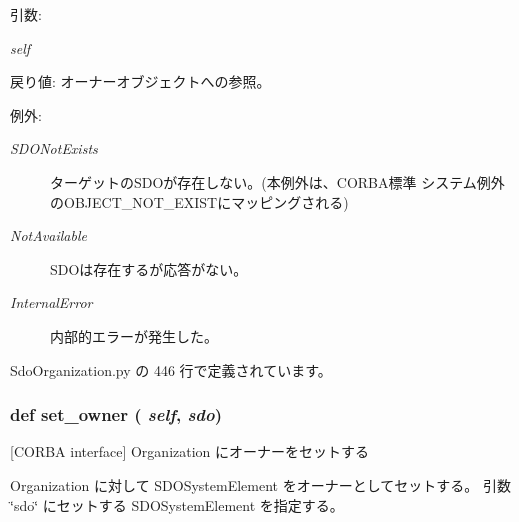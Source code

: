 \begin{Desc}
\item[引数:]
\begin{description}
\item[{\em self}]\end{description}
\end{Desc}
\begin{Desc}
\item[戻り値:]オーナーオブジェクトへの参照。\end{Desc}
\begin{Desc}
\item[例外:]
\begin{description}
\item[{\em SDONotExists}]ターゲットのSDOが存在しない。(本例外は、CORBA標準 システム例外のOBJECT\_\-NOT\_\-EXISTにマッピングされる) \item[{\em NotAvailable}]SDOは存在するが応答がない。 \item[{\em InternalError}]内部的エラーが発生した。 \end{description}
\end{Desc}


 SdoOrganization.py の 446 行で定義されています。
\subsubsection{\setlength{\rightskip}{0pt plus 5cm}def set\_\-owner ( {\em self},  {\em sdo})}\label{classsource__py_1_1_sdo_organization_1_1_organization__impl_18147ed56d2591de012f258ee37d8611}


[CORBA interface] Organization にオーナーをセットする 

Organization に対して SDOSystemElement をオーナーとしてセットする。 引数 \char`\"{}sdo\char`\"{} にセットする SDOSystemElement を指定する。

